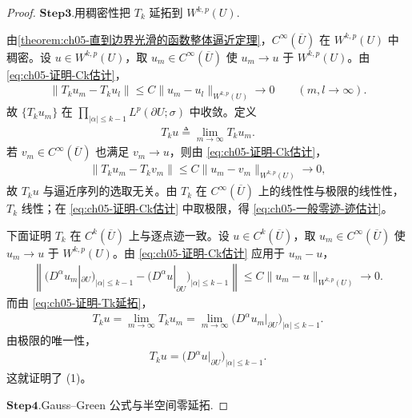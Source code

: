 \begin{proof}
\noindent$\mathbf{Step}\mathbf{3}.${\heiti 用稠密性把 $T_{k}$ 延拓到 $W^{k,p}(U)$.}

由\cref{theorem:ch05-直到边界光滑的函数整体逼近定理}，$C^{\infty}(\overline{U})$ 在 $W^{k,p}(U)$ 中稠密。设 $u\in W^{k,p}(U)$，取 $u_{m}\in C^{\infty}(\overline{U})$ 使 $u_{m}\to u$ 于 $W^{k,p}(U)$。由 \eqref{eq:ch05-证明-Ck估计}，
\begin{align*}
\|T_{k}u_{m}-T_{k}u_{l}\|
\leqslant C\|u_{m}-u_{l}\|_{W^{k,p}(U)}
\longrightarrow0
\qquad(m,l\to\infty).
\end{align*}
故 $\{T_{k}u_{m}\}$ 在 $\prod_{|\alpha|\leqslant k-1}L^{p}(\partial U;\sigma)$ 中收敛。定义
\begin{align}
T_{k}u\triangleq\lim_{m\to\infty}T_{k}u_{m}.
\label{eq:ch05-证明-Tk延拓}
\end{align}
若 $v_{m}\in C^{\infty}(\overline{U})$ 也满足 $v_{m}\to u$，则由 \eqref{eq:ch05-证明-Ck估计}，
\begin{align*}
\|T_{k}u_{m}-T_{k}v_{m}\|
\leqslant C\|u_{m}-v_{m}\|_{W^{k,p}(U)}
\longrightarrow0,
\end{align*}
故 $T_{k}u$ 与逼近序列的选取无关。由 $T_{k}$ 在 $C^{\infty}(\overline{U})$ 上的线性性与极限的线性性，$T_{k}$ 线性；在 \eqref{eq:ch05-证明-Ck估计} 中取极限，得 \eqref{eq:ch05-一般零迹-迹估计}。

下面证明 $T_{k}$ 在 $C^{k}(\overline{U})$ 上与逐点迹一致。设 $u\in C^{k}(\overline{U})$，取 $u_{m}\in C^{\infty}(\overline{U})$ 使 $u_{m}\to u$ 于 $W^{k,p}(U)$。由 \eqref{eq:ch05-证明-Ck估计} 应用于 $u_{m}-u$，
\begin{align*}
\left\|\bigl(D^{\alpha}u_{m}|_{\partial U}\bigr)_{|\alpha|\leqslant k-1}
-\bigl(D^{\alpha}u|_{\partial U}\bigr)_{|\alpha|\leqslant k-1}\right\|
\leqslant C\|u_{m}-u\|_{W^{k,p}(U)}
\longrightarrow0.
\end{align*}
而由 \eqref{eq:ch05-证明-Tk延拓}，
\begin{align*}
T_{k}u=\lim_{m\to\infty}T_{k}u_{m}
=\lim_{m\to\infty}\bigl(D^{\alpha}u_{m}|_{\partial U}\bigr)_{|\alpha|\leqslant k-1}.
\end{align*}
由极限的唯一性，
\begin{align}
T_{k}u=\bigl(D^{\alpha}u|_{\partial U}\bigr)_{|\alpha|\leqslant k-1}.
\label{eq:ch05-证明-Ck一致}
\end{align}
这就证明了 (1)。

\noindent$\mathbf{Step}\mathbf{4}.${\heiti Gauss--Green 公式与半空间零延拓.}


\end{proof}
